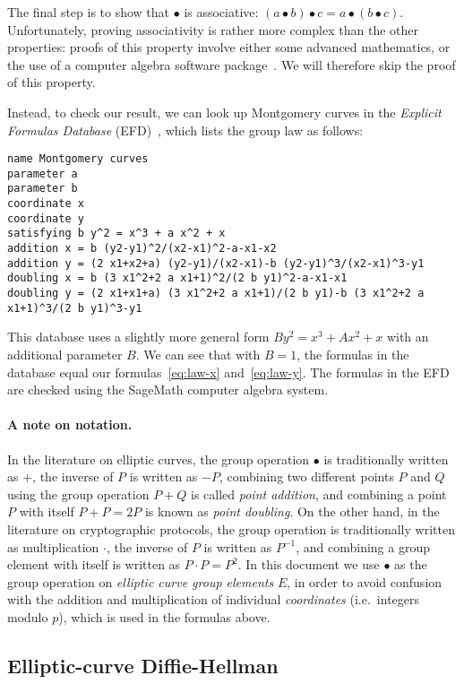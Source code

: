 \documentclass{article}
\begin{document}
The final step is to show that $\bullet$ is associative: $(a \bullet b) \bullet c = a \bullet (b \bullet c)$.
Unfortunately, proving associativity is rather more complex than the other properties: proofs of this property involve either some advanced mathematics, or the use of a computer algebra software package~\cite{Friedl:2017js,Fujii:2017eb}.
We will therefore skip the proof of this property.

Instead, to check our result, we can look up Montgomery curves in the \emph{Explicit Formulas Database} (EFD)~\cite{MontgomeryEFD}, which lists the group law as follows:
\begin{verbatim}
name Montgomery curves
parameter a
parameter b
coordinate x
coordinate y
satisfying b y^2 = x^3 + a x^2 + x
addition x = b (y2-y1)^2/(x2-x1)^2-a-x1-x2
addition y = (2 x1+x2+a) (y2-y1)/(x2-x1)-b (y2-y1)^3/(x2-x1)^3-y1
doubling x = b (3 x1^2+2 a x1+1)^2/(2 b y1)^2-a-x1-x1
doubling y = (2 x1+x1+a) (3 x1^2+2 a x1+1)/(2 b y1)-b (3 x1^2+2 a x1+1)^3/(2 b y1)^3-y1
\end{verbatim}
This database uses a slightly more general form $B y^2 = x^3 + A x^2 + x$ with an additional parameter $B$.
We can see that with $B=1$, the formulas in the database equal our formulas~\eqref{eq:law-x} and~\eqref{eq:law-y}.
The formulas in the EFD are checked using the SageMath computer algebra system.

\paragraph{A note on notation.}
In the literature on elliptic curves, the group operation $\bullet$ is traditionally written as $+$, the inverse of $P$ is written as $-P$, combining two different points $P$ and $Q$ using the group operation $P+Q$ is called \emph{point addition}, and combining a point $P$ with itself $P+P=2P$ is known as \emph{point doubling}.
On the other hand, in the literature on cryptographic protocols, the group operation is traditionally written as multiplication $\cdot$, the inverse of $P$ is written as $P^{-1}$, and combining a group element with itself is written as $P \cdot P = P^2$.
In this document we use $\bullet$ as the group operation on \emph{elliptic curve group elements} $E$, in order to avoid confusion with the addition and multiplication of individual \emph{coordinates} (i.e.\ integers modulo $p$), which is used in the formulas above.

\subsection{Elliptic-curve Diffie-Hellman}\label{sec:ecdh}
\end{document}
